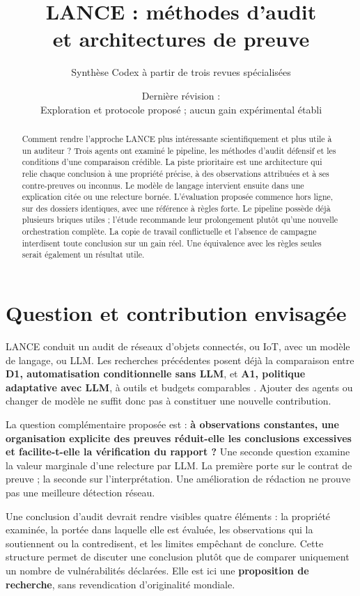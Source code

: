 \documentclass[11pt,a4paper]{article}
\title{LANCE : méthodes d'audit\\et architectures de preuve}
\author{Synthèse Codex à partir de trois revues spécialisées}
\date{Dernière révision : \revision\\[3pt]
 \small Exploration et protocole proposé ; aucun gain expérimental établi}
\begin{document}
\maketitle
\begin{abstract}
Comment rendre l'approche LANCE plus intéressante scientifiquement et plus
utile à un auditeur ? Trois agents ont examiné le pipeline, les méthodes
d'audit défensif et les conditions d'une comparaison crédible. La piste
prioritaire est une architecture qui relie chaque conclusion à une propriété
précise, à des observations attribuées et à ses contre-preuves ou inconnus.
Le modèle de langage intervient ensuite dans une explication citée ou une
relecture bornée. L'évaluation proposée commence hors ligne, sur des dossiers
identiques, avec une référence à règles forte. Le pipeline possède déjà plusieurs
briques utiles ; l'étude recommande leur prolongement plutôt qu'une nouvelle
orchestration complète. La copie de travail conflictuelle et l'absence de
campagne interdisent toute conclusion sur un gain réel. Une équivalence avec
les règles seules serait également un résultat utile.
\end{abstract}
\tableofcontents
\clearpage

\section{Question et contribution envisagée}
LANCE conduit un audit de réseaux d'objets connectés, ou IoT, avec un modèle
de langage, ou LLM. Les recherches précédentes posent déjà la comparaison
entre \textbf{D1, automatisation conditionnelle sans LLM}, et
\textbf{A1, politique adaptative avec LLM}, à outils et budgets comparables
\cite{precedent}. Ajouter des agents ou changer de modèle ne suffit donc pas
à constituer une nouvelle contribution.

La question complémentaire proposée est : \textbf{à observations constantes,
une organisation explicite des preuves réduit-elle les conclusions excessives
et facilite-t-elle la vérification du rapport ?} Une seconde question examine
la valeur marginale d'une relecture par LLM. La première porte sur le contrat
de preuve ; la seconde sur l'interprétation. Une amélioration de rédaction ne
prouve pas une meilleure détection réseau.

Une conclusion d'audit devrait rendre visibles quatre éléments : la propriété
examinée, la portée dans laquelle elle est évaluée, les observations qui la
soutiennent ou la contredisent, et les limites empêchant de conclure. Cette
structure permet de discuter une conclusion plutôt que de comparer uniquement
un nombre de vulnérabilités déclarées. Elle est ici une \textbf{proposition de
recherche}, sans revendication d'originalité mondiale.
\end{document}
